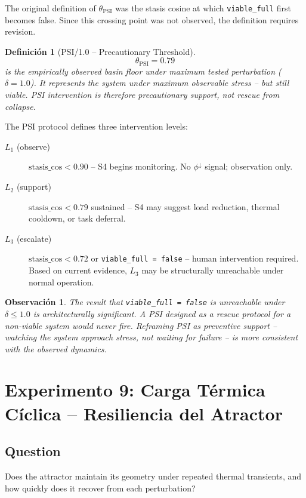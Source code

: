 \documentclass[11pt, a4paper]{article}
\newtheorem{definition}{Definición}
\newtheorem{remark}{Observación}
\begin{document}
The original definition of $\theta_\text{PSI}$ was the stasis cosine at
which \texttt{viable\_full} first becomes false.
Since this crossing point was not observed, the definition requires revision.

\begin{definition}[PSI/1.0 -- Precautionary Threshold]
\label{def:psi}
\begin{equation}
\theta_\text{PSI} = 0.79
\end{equation}
is the empirically observed basin floor under maximum tested perturbation
($\delta = 1.0$).
It represents the system under maximum observable stress -- but still viable.
PSI intervention is therefore \emph{precautionary support}, not rescue
from collapse.
\end{definition}

The PSI protocol defines three intervention levels:
\begin{description}
  \item[$L_1$ (observe)] $\text{stasis\_cos} < 0.90$ -- S4 begins monitoring.
        No $\phi^\downarrow$ signal; observation only.
  \item[$L_2$ (support)] $\text{stasis\_cos} < 0.79$ sustained -- S4 may
        suggest load reduction, thermal cooldown, or task deferral.
  \item[$L_3$ (escalate)] $\text{stasis\_cos} < 0.72$ or
        \texttt{viable\_full = false} -- human intervention required.
        Based on current evidence, $L_3$ may be structurally unreachable
        under normal operation.
\end{description}

\begin{remark}
The result that \texttt{viable\_full = false} is unreachable under
$\delta \le 1.0$ is architecturally significant.
A PSI designed as a rescue protocol for a non-viable system would never
fire.
Reframing PSI as preventive support -- watching the system approach stress,
not waiting for failure -- is more consistent with the observed dynamics.
\end{remark}


\section{Experimento 9: Carga Térmica Cíclica -- Resiliencia del Atractor}
\label{sec:thermal_cycling}

\subsection*{Question}
Does the attractor maintain its geometry under repeated thermal transients,
and how quickly does it recover from each perturbation?
\end{document}
